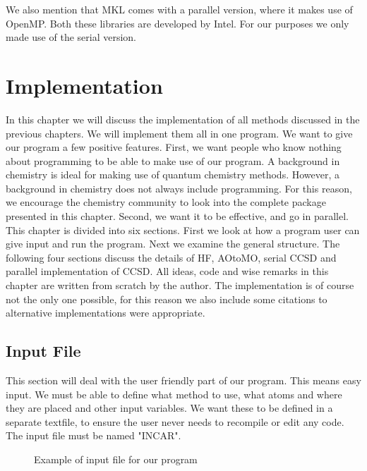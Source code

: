 \documentclass[a4paper,norsk,11pt,twoside]{report}
\begin{document}
We also mention that MKL comes with a parallel version, where it
makes use of OpenMP. Both these libraries are developed by Intel. For
our purposes we only made use of the serial version.











\chapter{Implementation}
In this chapter we will discuss the implementation of all methods
discussed in the previous chapters. We will implement them all in one
program. We want to give our program a few positive features. First,
we want people who know nothing about programming to be able to make
use of our program. A background in chemistry is ideal for making use
of quantum chemistry methods. However, a background in chemistry does
not always include programming. For this reason, we encourage the
chemistry community to look into the complete package presented in
this chapter. Second, we want it to be effective, and go in
parallel. \\

This chapter is divided into six sections. First we look at how a
program user can give input and run the program. Next we examine the
general structure. The following four sections discuss the details of
HF, AOtoMO, serial CCSD and parallel implementation of CCSD. All
ideas, code and wise remarks in this chapter are written
from scratch by the author. The implementation is of course not the
only one possible, for this reason we also include some citations to
alternative implementations were appropriate.

\section{Input File}
This section will deal with the user friendly part of our
program. This means easy input. We must be able to define what method
to use, what atoms and where they are placed and other input
variables. We want these to be defined in a separate textfile, to
ensure the user never needs to recompile or edit any code. The input
file must be named "INCAR". \\

\begin{figure}[h!]
\begin{center}
\caption{Example of input file for our program}
\label{fig:inputfile100}
\end{center}
\end{figure}
\end{document}
